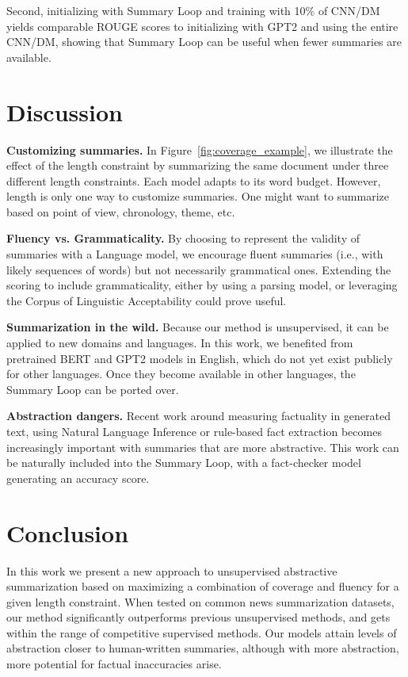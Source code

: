 \documentclass[11pt,a4paper]{article}
\begin{document}
Second, initializing with Summary Loop and training with 10\% of CNN/DM yields comparable ROUGE scores to initializing with GPT2 and using the entire CNN/DM, showing that Summary Loop can be useful when fewer summaries are available.

\section{Discussion}

\textbf{Customizing summaries.} In Figure~\ref{fig:coverage_example}, we illustrate the effect of the length constraint by summarizing the same document under three different length constraints. Each model adapts to its word budget. However, length is only one way to customize summaries. One might want to summarize based on point of view, chronology, theme, etc.

\textbf{Fluency vs. Grammaticality.} By choosing to represent the validity of summaries with a Language model, we encourage fluent summaries (i.e., with likely sequences of words) but not necessarily grammatical ones. Extending the scoring to include grammaticality, either by using a parsing model, or leveraging the Corpus of Linguistic Acceptability \cite{warstadt2019neural} could prove useful.

\textbf{Summarization in the wild.} Because our method is unsupervised, it can be applied to new domains and languages. In this work, we benefited from pretrained BERT and GPT2 models in English, which do not yet exist publicly for other languages. Once they become available in other languages, the Summary Loop can be ported over.

\textbf{Abstraction dangers.}  Recent work around measuring factuality in generated text, using Natural Language Inference \cite{guo2018soft} or rule-based fact extraction \cite{zhang2019optimizing} becomes increasingly important with summaries that are more abstractive. This work can be naturally included into the Summary Loop, with a fact-checker model generating an accuracy score.

\section{Conclusion}

In this work we present a new approach to unsupervised abstractive summarization based on maximizing a combination of coverage and fluency for a given length constraint. When tested on common news summarization datasets, our method significantly outperforms previous unsupervised methods, and gets within the range of competitive supervised methods. Our models attain levels of abstraction closer to human-written summaries, although with more abstraction, more potential for factual inaccuracies arise.
\end{document}
